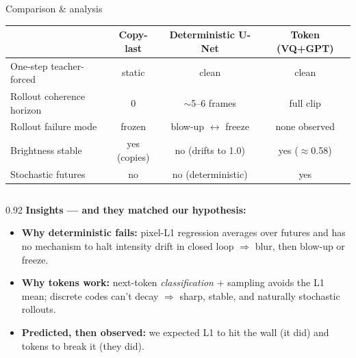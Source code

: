 \documentclass[aspectratio=169]{beamer}
\newcommand{\good}[1]{\textcolor{cGood}{#1}}
\newcommand{\bad}[1]{\textcolor{cBad}{#1}}
\begin{document}
\begin{frame}{Comparison \& analysis}
  \centering
  \renewcommand{\arraystretch}{1.25}
  \footnotesize
  \begin{tabular}{lccc}
    \toprule
    & \textbf{Copy-last} & \textbf{Deterministic U-Net} & \textbf{Token (VQ+GPT)} \\
    \midrule
    One-step teacher-forced     & static        & \good{clean}              & \good{clean} \\
    Rollout coherence horizon   & 0             & \bad{$\sim$5--6 frames}   & \good{full clip} \\
    Rollout failure mode        & frozen        & \bad{blow-up $\leftrightarrow$ freeze} & \good{none observed} \\
    Brightness stable           & yes (copies)  & \bad{no (drifts to 1.0)}  & \good{yes ($\approx$0.58)} \\
    Stochastic futures          & no            & \bad{no (deterministic)}  & \good{yes} \\
    \bottomrule
  \end{tabular}

  \vspace{0.7em}
  \begin{columns}
    \begin{column}{0.92\textwidth}
      \footnotesize
      \textbf{Insights — and they matched our hypothesis:}
      \begin{itemize}
        \item \textbf{Why deterministic fails:} pixel-L1 regression averages
              over futures and has no mechanism to halt intensity drift in
              closed loop $\Rightarrow$ blur, then blow-up or freeze.
        \item \textbf{Why tokens work:} next-token \emph{classification} +
              sampling avoids the L1 mean; discrete codes can't decay
              $\Rightarrow$ sharp, stable, and naturally stochastic rollouts.
        \item \textbf{Predicted, then observed:} we expected L1 to hit the wall
              (it did) and tokens to break it (they did).
      \end{itemize}
    \end{column}
  \end{columns}
\end{frame}
\end{document}
